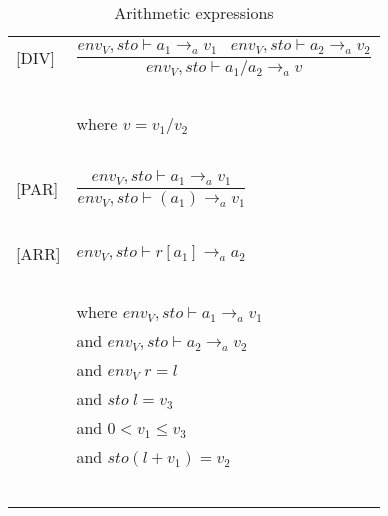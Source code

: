 \begin{longtable}{l l}
[DIV] & $\dfrac{env_V, sto \vdash a_1 \rightarrow_a v_1 \; \; \; env_V, sto \vdash a_2 \rightarrow_a v_2}{env_V, sto \vdash a_1 / a_2 \rightarrow_a v}$ \\
~ & ~ \\
~ & \indent\indent where $v = v_1 / v_2$ \\
~ & ~ \\

[PAR] & $\dfrac{env_V, sto \vdash a_1 \rightarrow_a v_1}{env_V, sto \vdash (a_1) \rightarrow_a v_1}$ \\
~ & ~ \\

[ARR] & $env_V, sto \vdash r[a_1] \rightarrow_a a_2$ \\
~ & ~ \\
~ & \indent\indent where $env_V, sto \vdash a_1 \rightarrow_a v_1$ \\
~ & \indent\indent and $env_V, sto \vdash a_2 \rightarrow_a v_2$ \\
~ & \indent\indent and $env_V \; r = l$ \\
~ & \indent\indent and $sto \; l = v_3$ \\
~ & \indent\indent and $0 < v_1 \leq v_3$ \\
~ & \indent\indent and $sto(l + v_1) = v_2$ \\
~ & ~ \\
\caption{Arithmetic expressions}
\end{longtable}

